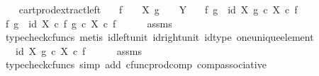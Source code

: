 \begin{isabellebody}
\ \ \isamarkupfalse%
\isanewline
{}\isamarkupfalse%
%
\endisatagproof
{\isafoldproof}%
%
\isadelimproof
\isanewline
%
\endisadelimproof
\isanewline
{}\isamarkupfalse%
\ cart{\isacharunderscore}{\kern0pt}prod{\isacharunderscore}{\kern0pt}extract{\isacharunderscore}{\kern0pt}left{\isacharcolon}{\kern0pt}\isanewline
\ \ \ {\isachardoublequoteopen}f\ {\isacharcolon}{\kern0pt}\ {\isasymone}\ {\isasymrightarrow}\ X{\isachardoublequoteclose}\ {\isachardoublequoteopen}g\ {\isacharcolon}{\kern0pt}\ {\isasymone}\ {\isasymrightarrow}\ Y{\isachardoublequoteclose}\isanewline
\ \ \ {\isachardoublequoteopen}{\isasymlangle}f{\isacharcomma}{\kern0pt}\ g{\isasymrangle}\ {\isacharequal}{\kern0pt}\ {\isasymlangle}id\ X{\isacharcomma}{\kern0pt}\ g\ {\isasymcirc}\isactrlsub c\ {\isasymbeta}\isactrlbsub X\isactrlesub {\isasymrangle}\ {\isasymcirc}\isactrlsub c\ f{\isachardoublequoteclose}\isanewline
%
\isadelimproof
%
\endisadelimproof
%
\isatagproof
{}\isamarkupfalse%
\ {\isacharminus}{\kern0pt}\isanewline
\ \ \isamarkupfalse%
\ {\isachardoublequoteopen}{\isasymlangle}f{\isacharcomma}{\kern0pt}\ g{\isasymrangle}\ {\isacharequal}{\kern0pt}\ {\isasymlangle}id\ X\ {\isasymcirc}\isactrlsub c\ f{\isacharcomma}{\kern0pt}\ g\ {\isasymcirc}\isactrlsub c\ {\isasymbeta}\isactrlbsub X\isactrlesub \ {\isasymcirc}\isactrlsub c\ f{\isasymrangle}{\isachardoublequoteclose}\isanewline
\ \ \ \ \isamarkupfalse%
\ assms\ \isamarkupfalse%
\ {\isacharparenleft}{\kern0pt}typecheck{\isacharunderscore}{\kern0pt}cfuncs{\isacharcomma}{\kern0pt}\ metis\ id{\isacharunderscore}{\kern0pt}left{\isacharunderscore}{\kern0pt}unit{}\ id{\isacharunderscore}{\kern0pt}right{\isacharunderscore}{\kern0pt}unit{}\ id{\isacharunderscore}{\kern0pt}type\ one{\isacharunderscore}{\kern0pt}unique{\isacharunderscore}{\kern0pt}element{\isacharparenright}{\kern0pt}\isanewline
\ \ \isamarkupfalse%
\ \isamarkupfalse%
\ {\isachardoublequoteopen}{\isachardot}{\kern0pt}{\isachardot}{\kern0pt}{\isachardot}{\kern0pt}\ {\isacharequal}{\kern0pt}\ {\isasymlangle}id\ X{\isacharcomma}{\kern0pt}\ g\ {\isasymcirc}\isactrlsub c\ {\isasymbeta}\isactrlbsub X\isactrlesub {\isasymrangle}\ {\isasymcirc}\isactrlsub c\ f{\isachardoublequoteclose}\isanewline
\ \ \ \ \isamarkupfalse%
\ assms\ \isamarkupfalse%
\ {\isacharparenleft}{\kern0pt}typecheck{\isacharunderscore}{\kern0pt}cfuncs{\isacharcomma}{\kern0pt}\ simp\ add{\isacharcolon}{\kern0pt}\ cfunc{\isacharunderscore}{\kern0pt}prod{\isacharunderscore}{\kern0pt}comp\ comp{\isacharunderscore}{\kern0pt}associative{}{\isacharparenright}{\kern0pt}\isanewline

\end{isabellebody}
